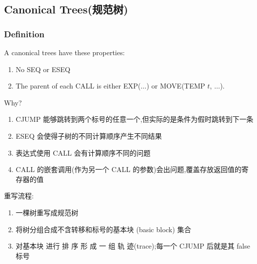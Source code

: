 \subsection{Canonical Trees(规范树)}
\subsubsection{Definition}
\begin{definition}
    A canonical trees have these properties:
    \begin{enumerate}
        \item No SEQ or ESEQ
        \item The parent of each CALL is either EXP($\dots$) or MOVE(TEMP $t$, $\dots$).
    \end{enumerate}
\end{definition}

Why?
\begin{enumerate}
    \item CJUMP 能够跳转到两个标号的任意一个,但实际的是条件为假时跳转到下一条
    \item ESEQ 会使得子树的不同计算顺序产生不同结果
    \item 表达式使用 CALL 会有计算顺序不同的问题
    \item CALL 的嵌套调用(作为另一个 CALL 的参数)会出问题,覆盖存放返回值的寄存器的值
\end{enumerate}

重写流程:
\begin{enumerate}
    \item 一棵树重写成规范树 
    \item 将树分组合成不含转移和标号的基本块 (basic block) 集合 
    \item 对基本块 进行 排 序 形 成 一 组 轨 迹(trace);每一个 CJUMP 后就是其 false 标号
\end{enumerate}


